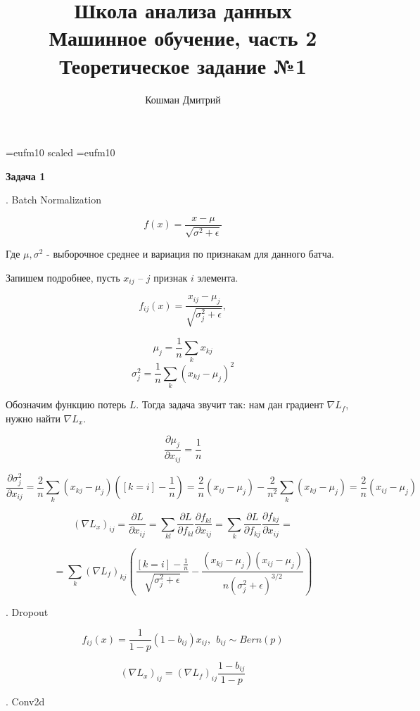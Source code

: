 \documentclass[10pt]{article}
\title{Школа анализа данных\\ Машинное обучение, часть 2 \\Теоретическое задание №1}
\author{Кошман Дмитрий}
\date{}
\begin{document}
	
	
	\voffset=-20mm
	\hoffset=-17mm
	\font\Got=eufm10 scaled \font\Got=eufm10
	
	
	\maketitle
	
	\bigskip
	
	\textbf{Задача 1}
	
	. Batch Normalization
	
	$$ f(x) = \frac{x - \mu}{\sqrt{\sigma^2 + \epsilon }} $$
	
	Где $\mu, \sigma^2$ - выборочное среднее и вариация по признакам для данного батча.
	
	Запишем подробнее, пусть $x_{ij}$ -- $j$ признак $i$ элемента.
	
	$$ f_{ij}(x) = \frac{x_{ij} - \mu_j}{\sqrt{\sigma_j^2 + \epsilon }} , $$
	
	$$ \mu_j = \frac{1}{n} \sum_k x_{kj} $$
	$$  \sigma_j^2 = \frac{1}{n} \sum_k (x_{kj} - \mu_j ) ^2$$

	Обозначим функцию потерь $L$. Тогда задача звучит так: нам дан градиент $ \nabla L_f$, \\
	нужно найти $\nabla L_x$.
	
	$$ \frac{\partial \mu_j}{\partial x_{ij}}  = \frac{1}{n}$$
	
	$$ \frac{\partial \sigma^2_j}{\partial x_{ij}}  = \frac{2}{n} \sum_k (x_{kj} - \mu_j ) ([k = i] - \frac{1}{n}) = 
	\frac{2}{n}(x_{ij} - \mu_j) - \frac{2}{n^2} \sum_k (x_{kj} - \mu_j ) = \frac{2}{n}(x_{ij} - \mu_j)$$
	
	$$ (\nabla L_x)_{ij} = \frac{\partial L}{\partial x_{ij}} = \sum_{kl} \frac{\partial L}{\partial f_{kl}} \frac{\partial f_{kl}}{\partial x_{ij}}   = 
	\sum_{k} \frac{\partial L}{\partial f_{kj}} \frac{\partial f_{kj}}{\partial x_{ij}} = $$
	
	$$ = \sum_{k} (\nabla L_f)_{kj} \left( \frac{[k=i] -\frac{1}{n}}{\sqrt{\sigma_j^2 + \epsilon }} -\frac{
		 (x_{kj} - \mu_j)(x_{ij} - \mu_j)}{n(\sigma_j^2 + \epsilon)^{3/2} } \right)$$
	 
	 . Dropout
	
	$$ f_{ij}(x) = \frac{1}{1-p} (1 -b_{ij})  x_{ij} , \medspace \medspace b_{ij} \sim Bern(p)$$
	
	$$ (\nabla L_x)_{ij} = (\nabla L_f)_{ij} \frac{1-b_{ij}}{1-p}$$
	
	 . Conv2d
	
\end{document}
